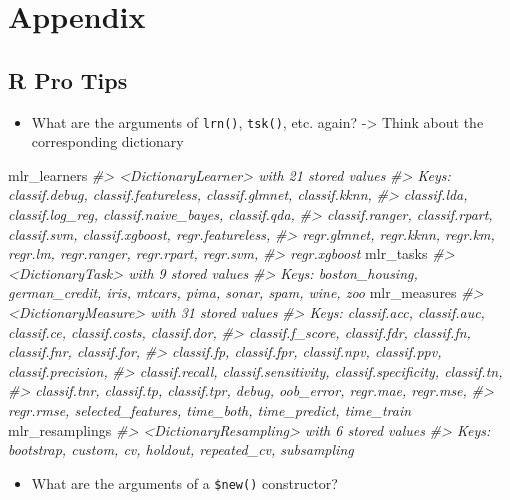\documentclass[]{article}
\newenvironment{Shaded}{\begin{snugshade}}{\end{snugshade}}
\newcommand{\CommentTok}[1]{\textcolor[rgb]{0.56,0.35,0.01}{\textit{#1}}}
\newcommand{\NormalTok}[1]{#1}
\providecommand{\tightlist}{%
  \setlength{\itemsep}{0pt}\setlength{\parskip}{0pt}}
\begin{document}
\hypertarget{appendix}{%
\section{Appendix}\label{appendix}}

\hypertarget{r-pro-tips}{%
\subsection{R Pro Tips}\label{r-pro-tips}}

\begin{itemize}
\tightlist
\item
  What are the arguments of \texttt{lrn()}, \texttt{tsk()}, etc. again?
  -\textgreater{} Think about the corresponding dictionary
\end{itemize}

\begin{Shaded}
\begin{Highlighting}[]
\NormalTok{mlr_learners}
\CommentTok{#> <DictionaryLearner> with 21 stored values}
\CommentTok{#> Keys: classif.debug, classif.featureless, classif.glmnet, classif.kknn,}
\CommentTok{#>   classif.lda, classif.log_reg, classif.naive_bayes, classif.qda,}
\CommentTok{#>   classif.ranger, classif.rpart, classif.svm, classif.xgboost, regr.featureless,}
\CommentTok{#>   regr.glmnet, regr.kknn, regr.km, regr.lm, regr.ranger, regr.rpart, regr.svm,}
\CommentTok{#>   regr.xgboost}
\NormalTok{mlr_tasks}
\CommentTok{#> <DictionaryTask> with 9 stored values}
\CommentTok{#> Keys: boston_housing, german_credit, iris, mtcars, pima, sonar, spam, wine, zoo}
\NormalTok{mlr_measures}
\CommentTok{#> <DictionaryMeasure> with 31 stored values}
\CommentTok{#> Keys: classif.acc, classif.auc, classif.ce, classif.costs, classif.dor,}
\CommentTok{#>   classif.f_score, classif.fdr, classif.fn, classif.fnr, classif.for,}
\CommentTok{#>   classif.fp, classif.fpr, classif.npv, classif.ppv, classif.precision,}
\CommentTok{#>   classif.recall, classif.sensitivity, classif.specificity, classif.tn,}
\CommentTok{#>   classif.tnr, classif.tp, classif.tpr, debug, oob_error, regr.mae, regr.mse,}
\CommentTok{#>   regr.rmse, selected_features, time_both, time_predict, time_train}
\NormalTok{mlr_resamplings}
\CommentTok{#> <DictionaryResampling> with 6 stored values}
\CommentTok{#> Keys: bootstrap, custom, cv, holdout, repeated_cv, subsampling}
\end{Highlighting}
\end{Shaded}

\begin{itemize}
\tightlist
\item
  What are the arguments of a \texttt{\$new()} constructor?
\end{itemize}
\end{document}
